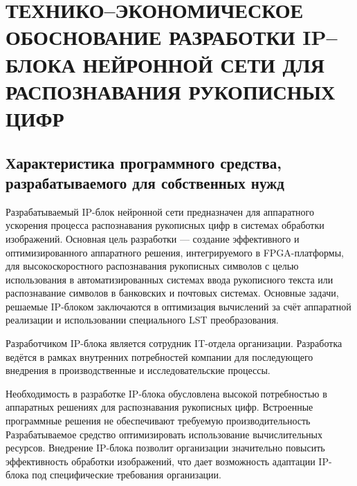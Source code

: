 \chapter[Технико–экономическое обоснование разработки IP–блока нейронной сети для распознавания рукописных цифр]
{ТЕХНИКО–ЭКОНОМИЧЕСКОЕ ОБОСНОВАНИЕ РАЗРАБОТКИ IP–БЛОКА НЕЙРОННОЙ СЕТИ ДЛЯ РАСПОЗНАВАНИЯ РУКОПИСНЫХ ЦИФР}

\section{Характеристика программного средства, разрабатываемого для собственных нужд}\par
\hspace*{12.5 mm}Разрабатываемый IP-блок нейронной сети предназначен для 
аппаратного ускорения процесса распознавания рукописных цифр в системах 
обработки изображений. Основная цель разработки — создание эффективного и 
оптимизированного аппаратного решения, интегрируемого в FPGA-платформы, для 
высокоскоростного распознавания рукописных символов с целью использования в 
автоматизированных системах ввода рукописного текста или распознавание символов 
в банковских и почтовых системах. Основные задачи, решаемые IP-блоком 
заключаются в оптимизация вычислений за счёт аппаратной реализации и 
использовании специального LST преобразования.

Разработчиком IP-блока является сотрудник IT-отдела организации. Разработка 
ведётся в рамках внутренних потребностей компании для последующего внедрения в 
производственные и исследовательские процессы.

Необходимость в разработке IP-блока обусловлена высокой потребностью в 
аппаратных решениях для распознавания рукописных цифр. Встроенные программные 
решения не обеспечивают требуемую производительность Разрабатываемое средство 
оптимизировать использование вычислительных ресурсов. Внедрение IP-блока 
позволит организации значительно повысить эффективность обработки изображений, 
что дает возможность адаптации IP-блока под специфические требования 
организации.

